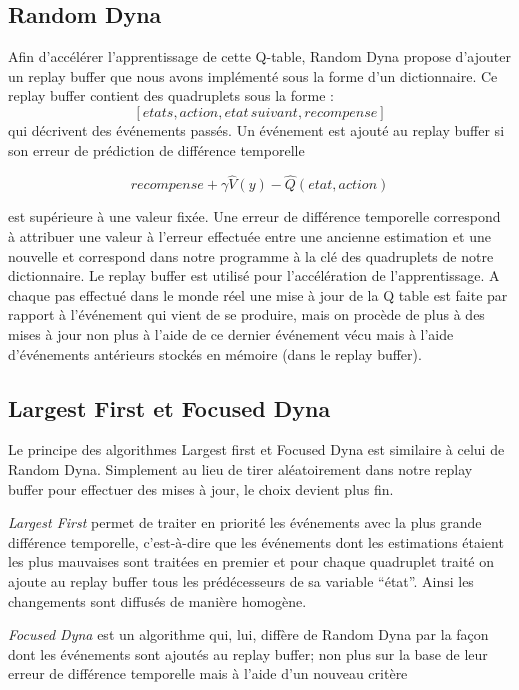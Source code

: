 \documentclass{article}
\begin{document}
\subsection{Random Dyna}

Afin d'accélérer l’apprentissage de cette Q-table, Random Dyna propose d’ajouter un replay buffer que nous avons implémenté sous la forme d’un dictionnaire.  Ce replay buffer contient des quadruplets sous la forme : 
$$[etats, action, etat\,suivant, recompense]$$ 
qui décrivent des événements passés. Un événement est ajouté au replay buffer si son erreur de prédiction de différence temporelle

 $$recompense + \gamma\hat{V}(y) - \hat{Q}(etat,action)$$    %
 
 est supérieure à une valeur fixée. Une erreur de différence temporelle correspond à attribuer une valeur à l’erreur effectuée entre une ancienne estimation et une nouvelle et correspond dans notre programme à la clé des quadruplets de notre dictionnaire.
 Le replay buffer est utilisé pour l'accélération de l’apprentissage. A chaque pas effectué dans le monde réel une mise à jour de la Q table est faite par rapport à l’événement qui vient de se produire, mais on procède de plus à des mises à jour non plus à l’aide de ce dernier événement vécu mais à l’aide d'événements antérieurs stockés en mémoire (dans le replay buffer).

\subsection{Largest First et Focused Dyna}

Le principe des algorithmes Largest first et Focused Dyna est similaire à celui de Random Dyna. Simplement au lieu de tirer aléatoirement dans notre replay buffer pour effectuer des mises à jour, le choix devient plus fin. 

\textit{Largest First} permet de traiter en priorité les événements avec la plus grande différence temporelle, c’est-à-dire que les événements dont les estimations étaient les plus mauvaises sont traitées en premier et pour chaque quadruplet traité on ajoute au replay buffer tous les prédécesseurs de sa variable “état”. Ainsi les changements sont diffusés de manière homogène. 

\textit{Focused Dyna} est un algorithme qui, lui, diffère de Random Dyna par  la façon dont les événements sont ajoutés au replay buffer; non plus sur la base de leur erreur de différence temporelle mais à l’aide d’un nouveau critère
\end{document}
